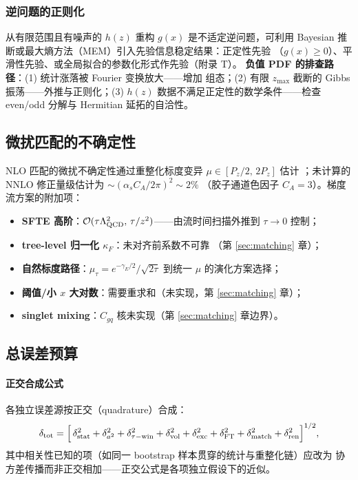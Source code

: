\documentclass[11pt,a4paper]{ctexart}
\newcommand{\order}[1]{\mathcal{O}(#1)}
\begin{document}
\subsubsection{逆问题的正则化}

从有限范围且有噪声的 $h(z)$ 重构 $g(x)$ 是不适定逆问题，可利用
Bayesian 推断或最大熵方法（MEM）引入先验信息稳定结果：正定性先验
（$g(x)\ge0$）、平滑性先验、或全局拟合的参数化形式作先验（附录 T）。
\textbf{负值 PDF 的排查路径}：(1) 统计涨落被 Fourier 变换放大——增加
组态；(2) 有限 $z_{\max}$ 截断的 Gibbs 振荡——外推与正则化；(3)
$h(z)$ 数据不满足正定性的数学条件——检查 even/odd 分解与 Hermitian
延拓的自洽性。

\subsection{微扰匹配的不确定性}

NLO 匹配的微扰不确定性通过重整化标度变异 $\mu\in[P_z/2,\,2P_z]$ 估计
；未计算的 NNLO 修正量级估计为 $\sim(\alpha_s C_A/2\pi)^2\sim2\%$
（胶子通道色因子 $C_A=3$）。梯度流方案的附加项：
\begin{itemize}
  \item \textbf{SFTE 高阶}：$\order{\tau\Lambda_{\rm QCD}^2,\,
  \tau/z^2}$——由流时间扫描外推到 $\tau\to0$ 控制；
  \item \textbf{tree-level 归一化 $\kappa_F$}：未对齐前系数不可靠
  （第 \ref{sec:matching} 章）；
  \item \textbf{自然标度路径}：$\mu_\tau=e^{-\gamma_E/2}/\sqrt{2\tau}$
  到统一 $\mu$ 的演化方案选择；
  \item \textbf{阈值/小 $x$ 大对数}：需要重求和（未实现，第
  \ref{sec:matching} 章）；
  \item \textbf{singlet mixing}：$C_{gq}$ 核未实现（第
  \ref{sec:matching} 章边界）。
\end{itemize}

\subsection{总误差预算}

\paragraph{正交合成公式}各独立误差源按正交（quadrature）合成：
\begin{equation}\label{eq:error-quadrature}
\delta_{\rm tot} = \Bigl[\,
\delta_{\rm stat}^2 + \delta_{a^2}^2 + \delta_{\tau{\rm -win}}^2
+ \delta_{\rm vol}^2 + \delta_{\rm exc}^2
+ \delta_{\rm FT}^2 + \delta_{\rm match}^2
+ \delta_{\rm ren}^2 \Bigr]^{1/2},
\end{equation}
其中相关性已知的项（如同一 bootstrap 样本贯穿的统计与重整化链）应改为
协方差传播而非正交相加——正交公式是各项独立假设下的近似。
\end{document}

